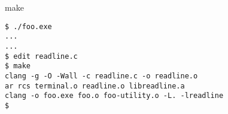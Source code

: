 \begin{frame}[fragile]{make}
\begin{Verbatim}
$ ./foo.exe
...
...
$ edit readline.c
$ make
clang -g -O -Wall -c readline.c -o readline.o
ar rcs terminal.o readline.o libreadline.a
clang -o foo.exe foo.o foo-utility.o -L. -lreadline
$ 
\end{Verbatim}
\end{frame}
